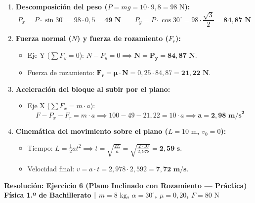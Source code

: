 \documentclass[11pt,a4paper]{article}
\begin{document}
\vspace{-0.1cm}
\begin{enumerate}[label=\textbf{\alph*)}, leftmargin=2em, itemsep=4pt]
    \item \textbf{Descomposición del peso ($P = mg = 10 \cdot 9{,}8 = 98\text{ N}$):}
    \[
    P_x = P \cdot \sin 30^\circ = 98 \cdot 0{,}5 = \mathbf{49\text{ N}} \qquad P_y = P \cdot \cos 30^\circ = 98 \cdot \frac{\sqrt{3}}{2} = \mathbf{84{,}87\text{ N}}
    \]

    \item \textbf{Fuerza normal ($N$) y fuerza de rozamiento ($F_r$):}
    \begin{itemize}[leftmargin=1.5em, itemsep=2pt]
        \item Eje Y ($\sum F_y = 0$): $N - P_y = 0 \implies \mathbf{N = P_y = 84{,}87\text{ N}}$.
        \item Fuerza de rozamiento: $\mathbf{F_r = \mu \cdot N} = 0{,}25 \cdot 84{,}87 = \mathbf{21{,}22\text{ N}}$.
    \end{itemize}

    \item \textbf{Aceleración del bloque al subir por el plano:}
    \begin{itemize}[leftmargin=1.5em, itemsep=2pt]
        \item Eje X ($\sum F_x = m \cdot a$):
        \[
        F - P_x - F_r = m \cdot a \implies 100 - 49 - 21{,}22 = 10 \cdot a \implies \mathbf{a = 2{,}98\text{ m/s}^2}
        \]
    \end{itemize}

    \item \textbf{Cinemática del movimiento sobre el plano ($L = 10\text{ m}$, $v_0 = 0$):}
    \begin{itemize}[leftmargin=1.5em, itemsep=2pt]
        \item Tiempo: $L = \frac{1}{2}at^2 \implies t = \sqrt{\frac{2L}{a}} = \sqrt{\frac{2 \cdot 10}{2{,}978}} = \mathbf{2{,}59\text{ s}}$.
        \item Velocidad final: $v = a \cdot t = 2{,}978 \cdot 2{,}592 = \mathbf{7{,}72\text{ m/s}}$.
    \end{itemize}
\end{enumerate}

\newpage

\begin{center}
    {\LARGE \textbf{Resolución: Ejercicio 6 (Plano Inclinado con Rozamiento — Práctica)}}\\[4pt]
    {\large \textbf{Física 1.º de Bachillerato | $m = 8\text{ kg}$, $\alpha = 30^\circ$, $\mu = 0{,}20$, $F = 80\text{ N}$}}
\end{center}
\end{document}
